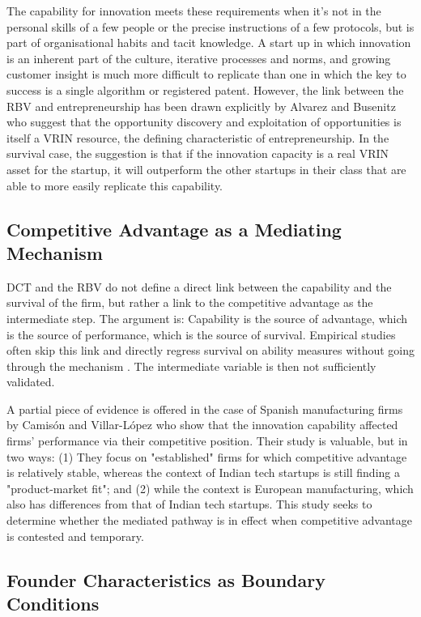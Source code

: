 \documentclass{ieeeaccess}
\begin{document}
The capability for innovation meets these requirements when it's not in the personal skills of a few people or the precise instructions of a few protocols, but is part of organisational habits and tacit knowledge. A start up in which innovation is an inherent part of the culture, iterative processes and norms, and growing customer insight is much more difficult to replicate than one in which the key to success is a single algorithm or registered patent. However, the link between the RBV and entrepreneurship has been drawn explicitly by Alvarez and Busenitz \cite{b17} who suggest that the opportunity discovery and exploitation of opportunities is itself a VRIN resource, the defining characteristic of entrepreneurship. In the survival case, the suggestion is that if the innovation capacity is a real VRIN asset for the startup, it will outperform the other startups in their class that are able to more easily replicate this capability.

\subsection{Competitive Advantage as a Mediating Mechanism}

DCT and the RBV do not define a direct link between the capability and the survival of the firm, but rather a link to the competitive advantage as the intermediate step. The argument is: Capability is the source of advantage, which is the source of performance, which is the source of survival. Empirical studies often skip this link and directly regress survival on ability measures without going through the mechanism \cite{b4,b5}. The intermediate variable is then not sufficiently validated.

A partial piece of evidence is offered in the case of Spanish manufacturing firms by Camisón and Villar-López \cite{b18} who show that the innovation capability affected firms' performance via their competitive position. Their study is valuable, but in two ways: (1) They focus on "established" firms for which competitive advantage is relatively stable, whereas the context of Indian tech startups is still finding a "product-market fit"; and (2) while the context is European manufacturing, which also has differences from that of Indian tech startups. This study seeks to determine whether the mediated pathway is in effect when competitive advantage is contested and temporary.

\subsection{Founder Characteristics as Boundary Conditions}
\end{document}
